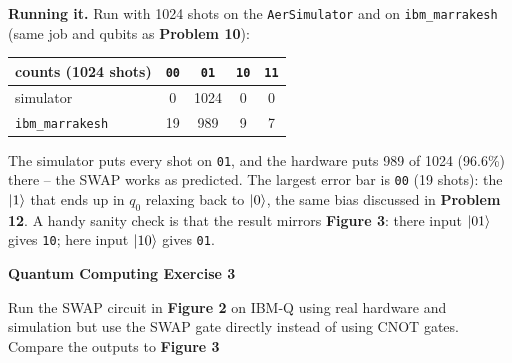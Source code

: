 \documentclass[a4paper, 10pt]{article}
\begin{document}
\begin{solution}
	\noindent \textbf{Running it.} Run with 1024 shots on the \texttt{AerSimulator} and on \texttt{ibm\_marrakesh} (same job and qubits as \textbf{Problem 10}):
	\begin{center}
		\begin{tabular}{lcccc}
			\toprule
			counts (1024 shots)     & \texttt{00} & \texttt{01} & \texttt{10} & \texttt{11} \\
			\midrule
			simulator               & 0           & 1024        & 0           & 0           \\
			\texttt{ibm\_marrakesh} & 19          & 989         & 9           & 7           \\
			\bottomrule
		\end{tabular}
	\end{center}
	\noindent The simulator puts every shot on \texttt{01}, and the hardware puts 989 of 1024 (96.6\%) there -- the SWAP works as predicted.
	The largest error bar is \texttt{00} (19 shots): the \( \ket{1} \) that ends up in \( q_0 \) relaxing back to \( \ket{0} \), the same bias discussed in \textbf{Problem 12}.
	A handy sanity check is that the result mirrors \textbf{Figure 3}: there input \( \ket{01} \) gives \texttt{10}; here input \( \ket{10} \) gives \texttt{01}.
\end{solution}

\begin{problem}
\textbf{Quantum Computing Exercise 3}
\par Run the SWAP circuit in \textbf{Figure 2} on IBM-Q
using real hardware and simulation but use the SWAP gate directly instead of using CNOT gates.
Compare the outputs to \textbf{Figure 3}
\end{problem}
\end{document}
